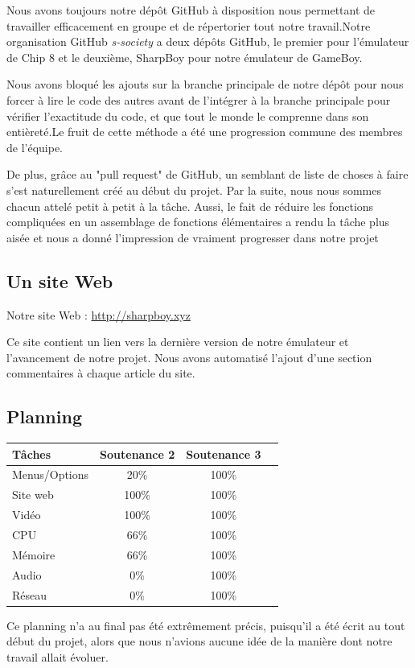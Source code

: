 \documentclass[12pt, a4paper]{article}
\begin{document}
Nous avons toujours notre dépôt GitHub à disposition nous permettant de travailler efficacement en groupe et de répertorier tout notre travail.Notre organisation GitHub \textit{s-society} a deux dépôts GitHub, le premier pour l'émulateur de Chip 8 et le deuxième, SharpBoy pour notre émulateur de GameBoy.

Nous avons bloqué les ajouts sur la branche principale de notre dépôt pour nous forcer à lire le code des autres avant de l'intégrer à la branche principale pour vérifier l'exactitude du code, et que tout le monde le comprenne dans son entièreté.Le fruit de cette méthode a été une progression commune des membres de l'équipe.

De plus, grâce au "pull request" de GitHub, un semblant de liste de choses à faire s'est naturellement créé au début du projet. Par la suite, nous nous sommes chacun attelé petit à petit à la tâche. Aussi, le fait de réduire les fonctions compliquées en un assemblage de fonctions élémentaires a rendu la tâche plus aisée et nous a donné l'impression de vraiment progresser dans notre projet

\subsection{Un site Web}

Notre site Web : \url{http://sharpboy.xyz}

Ce site contient un lien vers la dernière version de notre émulateur et l'avancement de notre projet. Nous avons automatisé l'ajout d'une section commentaires à chaque article du site.

\bigskip
\subsection{Planning}

\bigskip

\begin{center}
\begin{tabular}{|l|c|c|c|}
\hline
\bf Tâches          & \bf Soutenance 2      & \bf Soutenance 3  \\
\hline 
Menus/Options       &        20\%           & 100\%  \\
\hline 
Site web            &        100\%         & 100\%  \\
\hline 
Vidéo               &        100\%          & 100\%  \\
\hline 
CPU                 &        66\%          & 100\%  \\
\hline 
Mémoire             &        66\%         & 100\%  \\
\hline
Audio               &        0\%           & 100\%  \\
\hline
Réseau              &        0\%           & 100\%  \\

\hline
\end{tabular}
\end{center}
\bigskip
Ce planning n'a au final pas été extrêmement précis, puisqu'il a été écrit au tout début du projet, alors que nous n'avions aucune idée de la manière dont notre travail allait évoluer. 
\end{document}
